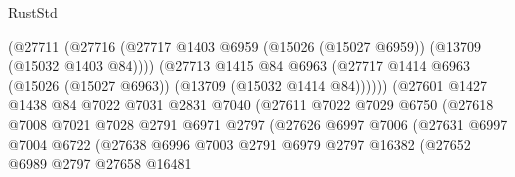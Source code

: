 \begin{lexlean}{RustStd}
\begin{coremodule}
                                    (@27711
                                      (@27716
                                        (@27717
                                          @1403
                                          @6959
                                          (@15026 (@15027 @6959))
                                          (@13709 (@15032 @1403 @84))))
                                      (@27713
                                        @1415
                                        @84
                                        @6963
                                        (@27717
                                          @1414
                                          @6963
                                          (@15026 (@15027 @6963))
                                          (@13709 (@15032 @1414 @84))))))
                                  (@27601
                                    @1427
                                    @1438
                                    @84
                                    @7022
                                    @7031
                                    @2831
                                    @7040
                                    (@27611
                                      @7022
                                      @7029
                                      @6750
                                      (@27618
                                        @7008
                                        @7021
                                        @7028
                                        @2791
                                        @6971
                                        @2797
                                        (@27626
                                          @6997
                                          @7006
                                          (@27631
                                            @6997
                                            @7004
                                            @6722
                                            (@27638
                                              @6996
                                              @7003
                                              @2791
                                              @6979
                                              @2797
                                              @16382
                                              (@27652
                                                @6989
                                                @2797
                                                @27658
                                                @16481

\end{coremodule}
\end{lexlean}
